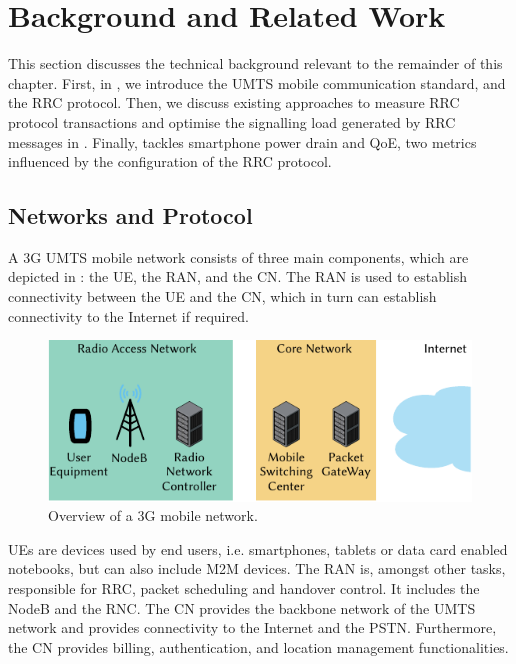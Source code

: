 \section{Background and Related Work}\label{sec:network:background}
This section discusses the technical background relevant to the remainder of this chapter.
First, in , we introduce the \gls{UMTS} mobile communication standard, and the \gls{RRC} protocol.
Then, we discuss existing approaches to measure \gls{RRC} protocol transactions and optimise the signalling load generated by \gls{RRC} messages in .
Finally,  tackles smartphone power drain and \gls{QoE}, two metrics influenced by the configuration of the \gls{RRC} protocol.

\subsection{ Networks and  Protocol}\label{sec:network:background:umts_rrc}
A \gls{3G} \gls{UMTS} mobile network consists of three main components, which are depicted in : the \gls{UE}, the \gls{RAN}, and the \gls{CN}.
The \gls{RAN} is used to establish connectivity between the \gls{UE} and the \gls{CN}, which in turn can establish connectivity to the Internet if required.

\begin{figure}
	\centering
	\includegraphics{network/background/figures/mobile_network_overview}
	\caption{Overview of a \gls{3G} mobile network.}
	\label{fig:network:background:mobile_network_overview}
\end{figure}

\glspl{UE} are devices used by end users, i.e. smartphones, tablets or data card enabled notebooks, but can also include \gls{M2M} devices.
The \gls{RAN} is, amongst other tasks, responsible for \gls{RRC}, packet scheduling and handover control.
It includes the NodeB and the \gls{RNC}.
The \gls{CN} provides the backbone network of the \gls{UMTS} network and provides connectivity to the Internet and the \gls{PSTN}.
Furthermore, the \gls{CN} provides billing, authentication, and location management functionalities.

